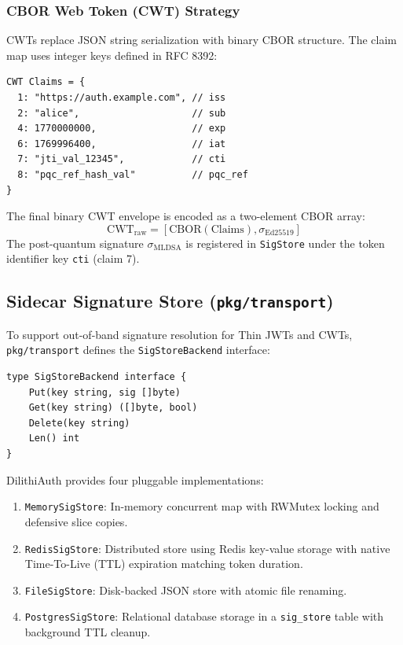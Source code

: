 \documentclass[conference]{IEEEtran}
\begin{document}
\subsubsection{CBOR Web Token (CWT) Strategy}
CWTs replace JSON string serialization with binary CBOR structure. The claim map uses integer keys defined in RFC 8392:
{\small
\begin{verbatim}
CWT Claims = {
  1: "https://auth.example.com", // iss
  2: "alice",                    // sub
  4: 1770000000,                 // exp
  6: 1769996400,                 // iat
  7: "jti_val_12345",            // cti
  8: "pqc_ref_hash_val"          // pqc_ref
}
\end{verbatim}
}
The final binary CWT envelope is encoded as a two-element CBOR array:
\begin{equation}
\text{CWT}_{\text{raw}} = \left[ \text{CBOR}(\text{Claims}), \sigma_{\text{Ed25519}} \right]
\end{equation}
The post-quantum signature $\sigma_{\text{MLDSA}}$ is registered in \texttt{SigStore} under the token identifier key \texttt{cti} (claim 7).

\subsection{Sidecar Signature Store (\texttt{pkg/transport})}
To support out-of-band signature resolution for Thin JWTs and CWTs, \texttt{pkg/transport} defines the \texttt{SigStoreBackend} interface:
{\small
\begin{verbatim}
type SigStoreBackend interface {
    Put(key string, sig []byte)
    Get(key string) ([]byte, bool)
    Delete(key string)
    Len() int
}
\end{verbatim}
}
DilithiAuth provides four pluggable implementations:
\begin{enumerate}
    \item \texttt{MemorySigStore}: In-memory concurrent map with RWMutex locking and defensive slice copies.
    \item \texttt{RedisSigStore}: Distributed store using Redis key-value storage with native Time-To-Live (TTL) expiration matching token duration.
    \item \texttt{FileSigStore}: Disk-backed JSON store with atomic file renaming.
    \item \texttt{PostgresSigStore}: Relational database storage in a \texttt{sig\_store} table with background TTL cleanup.
\end{enumerate}
\end{document}
